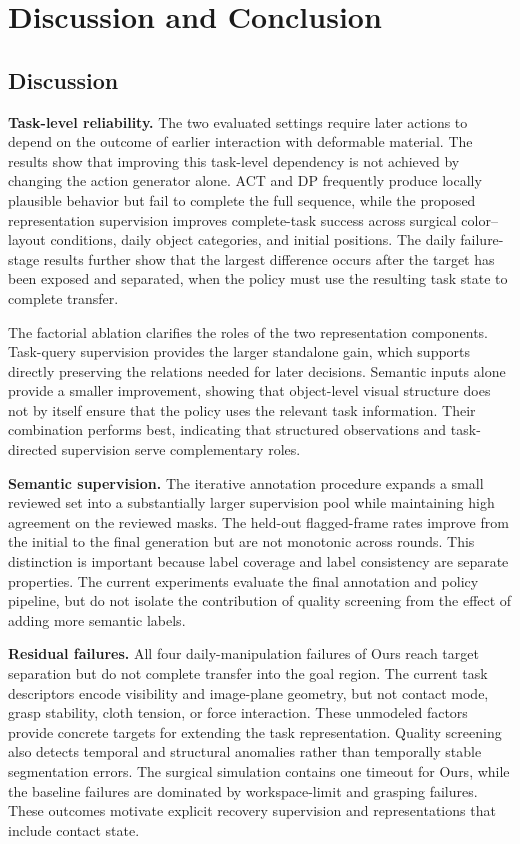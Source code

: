 \section{Discussion and Conclusion}
\label{sec:discussion}

\subsection{Discussion}
\noindent\textbf{Task-level reliability.}
The two evaluated settings require later actions to depend on the outcome of earlier interaction with deformable material.
The results show that improving this task-level dependency is not achieved by changing the action generator alone.
ACT and DP frequently produce locally plausible behavior but fail to complete the full sequence, while the proposed representation supervision improves complete-task success across surgical color--layout conditions, daily object categories, and initial positions.
The daily failure-stage results further show that the largest difference occurs after the target has been exposed and separated, when the policy must use the resulting task state to complete transfer.

The factorial ablation clarifies the roles of the two representation components.
Task-query supervision provides the larger standalone gain, which supports directly preserving the relations needed for later decisions.
Semantic inputs alone provide a smaller improvement, showing that object-level visual structure does not by itself ensure that the policy uses the relevant task information.
Their combination performs best, indicating that structured observations and task-directed supervision serve complementary roles.

\noindent\textbf{Semantic supervision.}
The iterative annotation procedure expands a small reviewed set into a substantially larger supervision pool while maintaining high agreement on the reviewed masks.
The held-out flagged-frame rates improve from the initial to the final generation but are not monotonic across rounds.
This distinction is important because label coverage and label consistency are separate properties.
The current experiments evaluate the final annotation and policy pipeline, but do not isolate the contribution of quality screening from the effect of adding more semantic labels.

\noindent\textbf{Residual failures.}
All four daily-manipulation failures of Ours reach target separation but do not complete transfer into the goal region.
The current task descriptors encode visibility and image-plane geometry, but not contact mode, grasp stability, cloth tension, or force interaction.
These unmodeled factors provide concrete targets for extending the task representation.
Quality screening also detects temporal and structural anomalies rather than temporally stable segmentation errors.
The surgical simulation contains one timeout for Ours, while the baseline failures are dominated by workspace-limit and grasping failures.
These outcomes motivate explicit recovery supervision and representations that include contact state.

